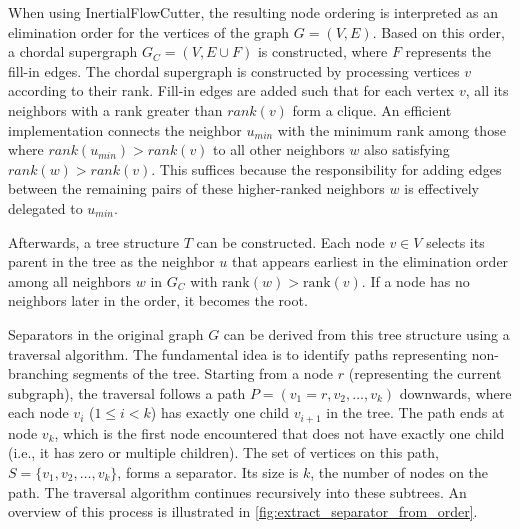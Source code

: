When using InertialFlowCutter, the resulting node ordering is interpreted as an elimination order for the vertices of the graph \( G = (V, E) \).
Based on this order, a chordal supergraph \( G_C = (V, E \cup F) \) is constructed, where \( F \) represents the fill-in edges.
The chordal supergraph is constructed by processing vertices \(v\) according to their rank.
Fill-in edges are added such that for each vertex \(v\), all its neighbors with a rank greater than \(rank(v)\) form a clique.
An efficient implementation connects the neighbor \(u_{min}\) with the minimum rank among those where \(rank(u_{min}) > rank(v)\) to all other neighbors \(w\) also satisfying \(rank(w) > rank(v)\).
This suffices because the responsibility for adding edges between the remaining pairs of these higher-ranked neighbors \(w\) is effectively delegated to \(u_{min}\).

Afterwards, a tree structure \(T\) can be constructed.
Each node \(v \in V\) selects its parent in the tree as the neighbor \(u\) that appears earliest in the elimination order among all neighbors \(w\) in \( G_C \) with \( \text{rank}(w) > \text{rank}(v) \).
If a node has no neighbors later in the order, it becomes the root.

Separators in the original graph \(G\) can be derived from this tree structure using a traversal algorithm.
The fundamental idea is to identify paths representing non-branching segments of the tree.
Starting from a node \(r\) (representing the current subgraph), the traversal follows a path \(P = (v_1=r, v_2, \dots, v_k)\) downwards, where each node \(v_i\) (\(1 \le i < k\)) has exactly one child \(v_{i+1}\) in the tree.
The path ends at node \(v_k\), which is the first node encountered that does not have exactly one child (i.e., it has zero or multiple children).
The set of vertices on this path, \(S = \{v_1, v_2, \dots, v_k\}\), forms a separator.
Its size is \(k\), the number of nodes on the path.
The traversal algorithm continues recursively into these subtrees.
An overview of this process is illustrated in \cref{fig:extract_separator_from_order}.

